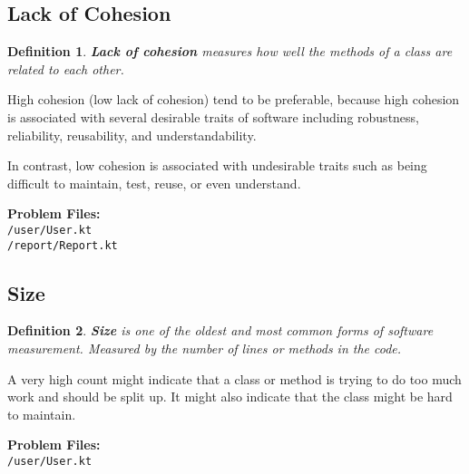 \documentclass[11pt]{article}
\newtheorem{definition}{Definition}
\begin{document}
\subsection{Lack of Cohesion}


\begin{definition}
\textbf{Lack of cohesion} measures how well the methods of a class are related to each other. 
\end{definition}

High cohesion (low lack of cohesion) tend to be preferable, because high cohesion is associated with several desirable traits of software including robustness, reliability, reusability, and understandability. 

In contrast, low cohesion is associated with undesirable traits such as being difficult to maintain, test, reuse, or even understand.

\begin{center}


\textbf{Problem Files:} \\
\texttt{/user/User.kt} \\
\texttt{/report/Report.kt} \\
\end{center}


\subsection{Size}
\begin{definition}
\textbf{Size} is one of the oldest and most common forms of software measurement. Measured by the number of lines or methods in the code. 
\end{definition}

A very high count might indicate that a class or method is trying to do too much work and should be split up. It might also indicate that the class might be hard to maintain.

\begin{center}

\textbf{Problem Files:} \\
\texttt{/user/User.kt} \\
\end{center}
\end{document}
